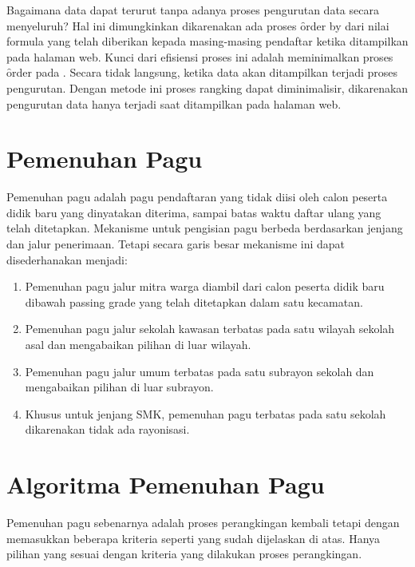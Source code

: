 Bagaimana data dapat terurut tanpa adanya proses pengurutan data secara
menyeluruh? Hal ini dimungkinkan dikarenakan ada proses \f{order by} dari nilai
formula yang telah diberikan kepada masing-masing pendaftar ketika ditampilkan
pada halaman web.  Kunci dari efisiensi proses ini adalah meminimalkan proses
\f{order} pada \database.  Secara tidak langsung, ketika data akan ditampilkan
terjadi proses pengurutan.  Dengan metode ini proses rangking dapat
diminimalisir, dikarenakan pengurutan data hanya terjadi saat ditampilkan pada
halaman web.


\section{Pemenuhan Pagu}
\label{sec:pemenuhan_pagu}

Pemenuhan pagu adalah pagu pendaftaran yang tidak diisi oleh calon peserta
didik baru yang dinyatakan diterima, sampai batas waktu daftar ulang yang telah
ditetapkan. Mekanisme untuk pengisian pagu berbeda berdasarkan jenjang dan
jalur penerimaan. Tetapi secara garis besar mekanisme ini dapat disederhanakan
menjadi:

\begin{enumerate} 
  \item Pemenuhan pagu jalur mitra warga diambil dari calon peserta didik baru
    dibawah passing grade yang telah ditetapkan dalam satu kecamatan.
  \item Pemenuhan pagu jalur sekolah kawasan terbatas pada satu wilayah sekolah
    asal dan mengabaikan pilihan di luar wilayah.
  \item Pemenuhan pagu jalur umum terbatas pada satu subrayon sekolah dan
    mengabaikan pilihan di luar subrayon.
  \item Khusus untuk jenjang SMK, pemenuhan pagu terbatas pada satu sekolah
    dikarenakan tidak ada rayonisasi.
\end{enumerate}


\section{Algoritma Pemenuhan Pagu}
\label{sec:algoritma_pemenuhan_pagu}

Pemenuhan pagu sebenarnya adalah proses perangkingan kembali tetapi dengan
memasukkan beberapa kriteria seperti yang sudah dijelaskan di atas. Hanya
pilihan yang sesuai dengan kriteria yang dilakukan proses perangkingan. 

